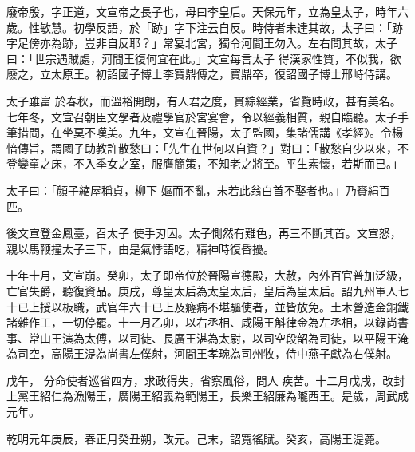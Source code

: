
\begin{pinyinscope}

 廢帝殷，字正道，文宣帝之長子也，母曰李皇后。天保元年，立為皇太子，時年六歲。性敏慧。初學反語，於「跡」字下注云自反。時侍者未達其故，太子曰：「跡字足傍亦為跡，豈非自反耶？」常宴北宮，獨令河間王勿入。左右問其故，太子曰：「世宗遇賊處，河間王復何宜在此。」文宣每言太子
 得漢家性質，不似我，欲廢之，立太原王。初詔國子博士李寶鼎傅之，寶鼎卒，復詔國子博士邢峙侍講。



 太子雖富
 於春秋，而溫裕開朗，有人君之度，貫綜經業，省覽時政，甚有美名。七年冬，文宣召朝臣文學者及禮學官於宮宴會，令以經義相質，親自臨聽。太子手筆措問，在坐莫不嘆美。九年，文宣在晉陽，太子監國，集諸儒講《孝經》。令楊愔傳旨，謂國子助教許散愁曰：「先生在世何以自資？」對曰：「散愁自少以來，不登孌童之床，不入季女之室，服膺簡策，不知老之將至。平生素懷，若斯而已。」



 太子曰：「顏子縮屋稱貞，柳下
 嫗而不亂，未若此翁白首不娶者也。」乃賚絹百匹。



 後文宣登金鳳臺，召太子
 使手刃囚。太子惻然有難色，再三不斷其首。文宣怒，親以馬鞭撞太子三下，由是氣悸語吃，精神時復昏擾。



 十年十月，文宣崩。癸卯，太子即帝位於晉陽宣德殿，大赦，內外百官普加泛級，亡官失爵，聽復資品。庚戌，尊皇太后為太皇太后，皇后為皇太后。詔九州軍人七十已上授以板職，武官年六十已上及癃病不堪驅使者，並皆放免。土木營造金銅鐵諸雜作工，一切停罷。十一月乙卯，以右丞相、咸陽王斛律金為左丞相，以錄尚書事、常山王演為太傅，以司徒、長廣王湛為太尉，以司空段韶為司徒，以平陽王淹為司空，高陽王湜為尚書左僕射，河間王孝琬為司州牧，侍中燕子獻為右僕射。



 戊午，
 分命使者巡省四方，求政得失，省察風俗，問人
 疾苦。十二月戊戌，改封上黨王紹仁為漁陽王，廣陽王紹義為範陽王，長樂王紹廉為隴西王。是歲，周武成元年。



 乾明元年庚辰，春正月癸丑朔，改元。己末，詔寬徭賦。癸亥，高陽王湜薨。




\end{pinyinscope}
